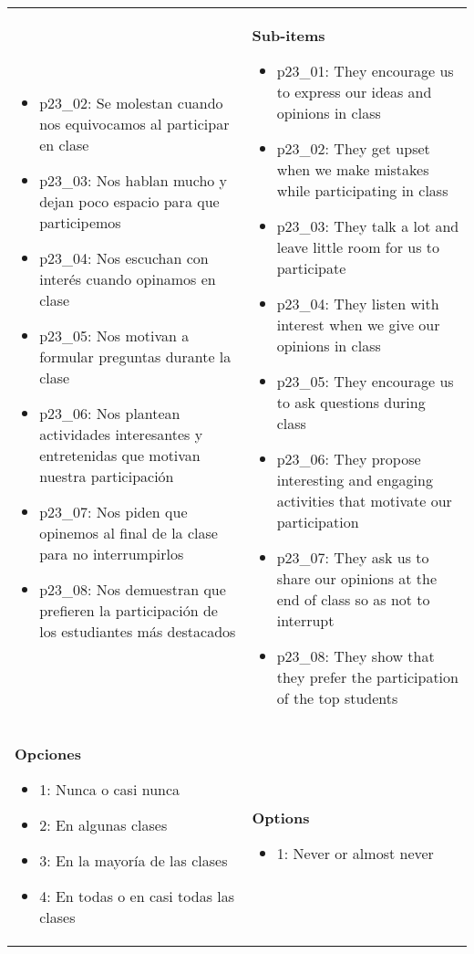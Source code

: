\documentclass[11pt]{article}
\begin{document}
\begin{longtable}{@{}LL@{}}
\begin{itemize}[leftmargin=*]
\item p23\_02: Se molestan cuando nos equivocamos al participar en clase
\item p23\_03: Nos hablan mucho y dejan poco espacio para que participemos
\item p23\_04: Nos escuchan con interés cuando opinamos en clase
\item p23\_05: Nos motivan a formular preguntas durante la clase
\item p23\_06: Nos plantean actividades interesantes y entretenidas que motivan nuestra participación
\item p23\_07: Nos piden que opinemos al final de la clase para no interrumpirlos
\item p23\_08: Nos demuestran que prefieren la participación de los estudiantes más destacados\end{itemize} & \textbf{Sub-items}\par\begin{itemize}[leftmargin=*]\item p23\_01: They encourage us to express our ideas and opinions in class
\item p23\_02: They get upset when we make mistakes while participating in class
\item p23\_03: They talk a lot and leave little room for us to participate
\item p23\_04: They listen with interest when we give our opinions in class
\item p23\_05: They encourage us to ask questions during class
\item p23\_06: They propose interesting and engaging activities that motivate our participation
\item p23\_07: They ask us to share our opinions at the end of class so as not to interrupt
\item p23\_08: They show that they prefer the participation of the top students\end{itemize} \\
\textbf{Opciones}\par\begin{itemize}[leftmargin=*]\item 1: Nunca o casi nunca
\item 2: En algunas clases
\item 3: En la mayoría de las clases
\item 4: En todas o en casi todas las clases\end{itemize} & \textbf{Options}\par\begin{itemize}[leftmargin=*]\item 1: Never or almost never

\end{itemize}
\end{longtable}
\end{document}
